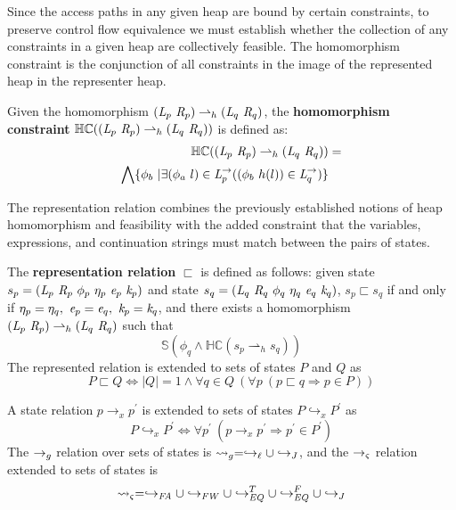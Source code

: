 Since the access paths in any given heap are bound by certain constraints, to preserve control flow equivalence we must establish whether the collection of any constraints in a given heap are collectively feasible. The homomorphism constraint is the conjunction of all constraints in the image of the represented heap in the representer heap.

\begin{definition}
\label{def:hc}
Given the homomorphism $(\emph{L}_p\ \emph{R}_p) \rightharpoonup_{h} (\emph{L}_q\ \emph{R}_q)$, the \textbf{homomorphism constraint} $\mathbb{HC}((\cfgnt{L}_p\ \cfgnt{R}_p) \rightharpoonup_{h} (\cfgnt{L}_q\ \cfgnt{R}_q))$ is defined as:
\begin{align*}
\mathbb{HC}((\cfgnt{L}_p\ \cfgnt{R}_p) \rightharpoonup_{h} (\cfgnt{L}_q\ \cfgnt{R}_q)) &= \\
 \bigwedge \{ \phi_b\ | \exists (\phi_a\ l) \in \cfgnt{L}_p^\rightarrow ( (\phi_b\ h(l)) \in \cfgnt{L}_q^\rightarrow)\} 
\end{align*}
\end{definition}

The representation relation combines the previously established notions of heap homomorphism and feasibility with the added constraint that the variables, expressions, and continuation strings must match between the pairs of states. 

\begin{definition}
\label{representation}
The \textbf{representation relation} $\sqsubset$ is defined as
follows: given state $s_p = (
\emph{L}_p\ \emph{R}_p\ \phi_p\ \eta_p\ \emph{e}_p\ \emph{k}_p )$
and state $s_q = (
\emph{L}_q\ \emph{R}_q\ \phi_q\ \eta_q\ \emph{e}_q\ \emph{k}_q )$,
$s_p \sqsubset s_q $ if and only if $\eta_p = \eta_q ,\ \emph{e}_p =
\emph{e}_q ,\ \emph{k}_p = \emph{k}_q$, and there exists a
homomorphism $(\emph{L}_p\ \emph{R}_p) \rightharpoonup_{h}
(\emph{L}_q\ \emph{R}_q)$ such that
\begin{equation}
\label{eqn:valid}
 \mathbb{S}( \phi_q \wedge \mathbb{HC}(s_p \rightharpoonup_{h} s_q) ) 
\end{equation}
The represented relation is extended to sets of states $P$ and $Q$ as
$$
P \sqsubset Q \Longleftrightarrow |Q| = 1 \wedge \forall q \in Q\ (\forall p\ (p \sqsubset q \Rightarrow p \in P))
$$
\end{definition}

\begin{definition}
\label{def:meta}
A state relation $p \rightarrow_x p^\prime$ is extended to sets of states $P \hookrightarrow_x P^\prime$ as
$$
P \hookrightarrow_x P^\prime \Longleftrightarrow \forall p^\prime\ (p \rightarrow_x p^\prime \Rightarrow p^\prime \in P^\prime)
$$
The $\rightarrow_{g}$ relation over sets of states is $\leadsto_{g} = \hookrightarrow_\ell \cup \hookrightarrow_{J}$, and 
the $\rightarrow_{\varsigma}$ relation extended to sets of states is 
$$
\leadsto_{\varsigma} = \hookrightarrow_\mathit{FA} \cup \hookrightarrow_\mathit{FW} \cup \hookrightarrow_\mathit{EQ}^T \cup \hookrightarrow_\mathit{EQ}^F \cup \hookrightarrow_{J}
$$
\end{definition}

